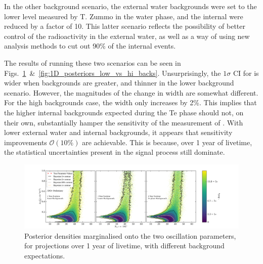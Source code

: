 In the other background scenario, the external water backgrounds were set to the lower level measured by T. Zummo in the water phase, and the internal  were reduced by a factor of 10. This latter scenario reflects the possibility of better control of the radioactivity in the external water, as well as a way of using new analysis methods to cut out 90\% of the internal  events.

The results of running these two scenarios can be seen in Figs.~\ref{fig:2D_posteriors_low_vs_hi_backs}~\&~\ref{fig:1D_posteriors_low_vs_hi_backs}. Unsurprisingly, the $1\sigma$ CI for \tonetwo{} is wider when backgrounds are greater, and thinner in the lower background scenario. However, the magnitudes of the change in width are somewhat different. For the high backgrounds case, the width only increases by 2\%. This implies that the higher internal backgrounds expected during the Te phase should not, on their own, substantially hamper the sensitivity of the measurement of \tonetwo{}. With lower external water and internal  backgrounds, it appears that sensitivity improvements $\mathcal{O}(10\%)$ are achievable. This is because, over 1 year of livetime, the statistical uncertainties present in the signal process still dominate.

\begin{figure}
    \centering
    \includegraphics[width=\textwidth]{6_SolarAnalysis/images/steve_style_contours_projections_low_vs_hi_1yr.png}
    \caption[Posterior densities marginalised onto the two oscillation parameters, for projections over 1 year of livetime, with different background expectations]
    {Posterior densities marginalised onto the two oscillation parameters, for projections over 1 year of livetime, with different background expectations.}
    \label{fig:2D_posteriors_low_vs_hi_backs}
\end{figure}

